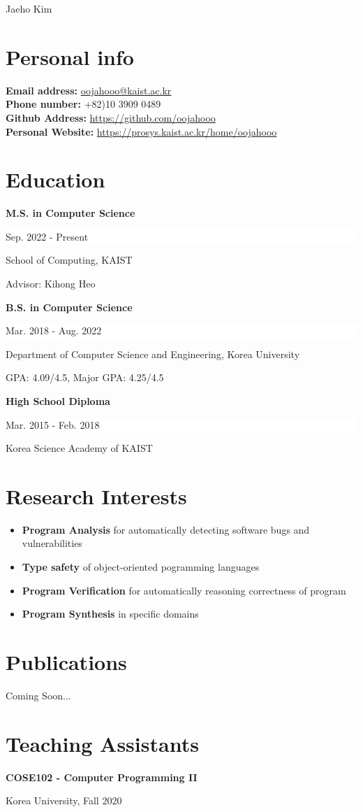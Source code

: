 \documentclass[paper=a4,fontsize=11pt]{scrartcl} %
\newlength{\spacebox}
\newcommand{\MyName}[1]{ %
                \Huge \hfill #1
                \par \normalsize \normalfont}
\newcommand{\NewPart}[1]{\section*{{#1}}}
\newcommand{\PersonalEntry}[2]{
		\noindent\hangindent=2em\hangafter=0 %
		\parbox{\spacebox}{        %
		\textit{#1}}		       %
		\hspace{1.5em} #2 \par}    %
\newcommand{\SkillsEntry}[2]{      %
		\noindent\hangindent=2em\hangafter=0 %
		\parbox{\spacebox}{        %
		\textit{#1}}			   %
		\hspace{1.5em} #2 \par}    %
\newcommand{\EducationEntry}[4]{
		\noindent \textbf{#1} \hfill      %
		\colorbox{White}{%
			\parbox{5cm}{%
			\hfill\color{Black}#2}} \par  %
		\noindent #3 \par        %
		\noindent\small #4 %
		\normalsize \par}
\begin{document}

\MyName{Jaeho Kim}



\NewPart{Personal info}{}
\textbf{Email address:} \href{mailto://oojahooo@kaist.ac.kr}{oojahooo@kaist.ac.kr} \\
\textbf{Phone number:} +82)10 3909 0489  \\
\textbf{Github Address:} \href{https://github.com/oojahooo}{https://github.com/oojahooo} \\
\textbf{Personal Website:} \href{https://prosys.kaist.ac.kr/home/oojahooo}{https://prosys.kaist.ac.kr/home/oojahooo}

\NewPart{Education}{}

\EducationEntry{M.S. in Computer Science}{Sep. 2022 - Present}{School of Computing, KAIST}{
	Advisor: Kihong Heo
}

\EducationEntry{B.S. in Computer Science}{Mar. 2018 - Aug. 2022}{Department of Computer Science and Engineering, Korea University}{
	GPA: 4.09/4.5, Major GPA: 4.25/4.5 \\
}

\EducationEntry{High School Diploma}{Mar. 2015 - Feb. 2018}{Korea Science Academy of KAIST}{}

\NewPart{Research Interests}{}

\begin{itemize}
	\item \textbf{Program Analysis} for automatically detecting software bugs and vulnerabilities
	\item \textbf{Type safety} of object-oriented pogramming languages
	\item \textbf{Program Verification} for automatically reasoning correctness of program
	\item \textbf{Program Synthesis} in specific domains
\end{itemize}


\NewPart{Publications}{}

Coming Soon...

\newpage

\NewPart{Teaching Assistants}{}

\EducationEntry{COSE102 - Computer Programming II}{}{Korea University, Fall 2020}{}



\end{document}
